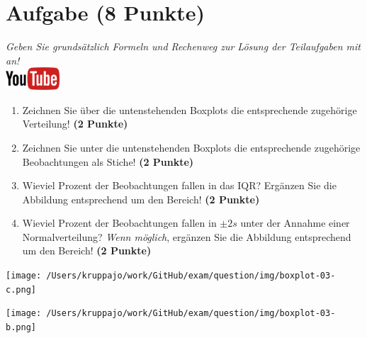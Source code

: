\documentclass[a4paper, 9pt]{scrartcl}\usepackage[]{graphicx}\usepackage[]{xcolor}
\begin{document}
 
\clearpage

\section{Aufgabe \hfill (8 Punkte)}

\textit{Geben Sie grunds{\"a}tzlich Formeln und Rechenweg zur L{\"o}sung der
  Teilaufgaben mit an!} \\[1Ex]

\hfill\href{https://youtu.be/Op-gjzASH9I}{\includegraphics[width =
  2cm]{img/youtube}}\\[1Ex]



\begin{enumerate}
\item Zeichnen Sie {\"u}ber die untenstehenden Boxplots die entsprechende
  zugeh{\"o}rige Verteilung! \textbf{(2 Punkte)} 
\item Zeichnen Sie unter die untenstehenden Boxplots die entsprechende
  zugeh{\"o}rige Beobachtungen als Stiche! \textbf{(2 Punkte)}
\item Wieviel Prozent der Beobachtungen fallen in das IQR? Erg{\"a}nzen Sie die
  Abbildung entsprechend um den Bereich! \textbf{(2 Punkte)}
\item Wieviel Prozent der Beobachtungen fallen in $\pm 2s$ unter
  der Annahme einer Normalverteilung?  \textit{Wenn m{\"o}glich}, erg{\"a}nzen Sie
  die Abbildung entsprechend um den Bereich! \textbf{(2 Punkte)}
\end{enumerate}

\vspace*{8cm}

\begin{minipage}[c]{.4\linewidth} %
  \texttt{[image: /Users/kruppajo/work/GitHub/exam/question/img/boxplot-03-c.png]}
\end{minipage}
\hspace{.1\linewidth}%
\begin{minipage}[c]{.4\linewidth} %
  \texttt{[image: /Users/kruppajo/work/GitHub/exam/question/img/boxplot-03-b.png]}
\end{minipage}
\end{document}
